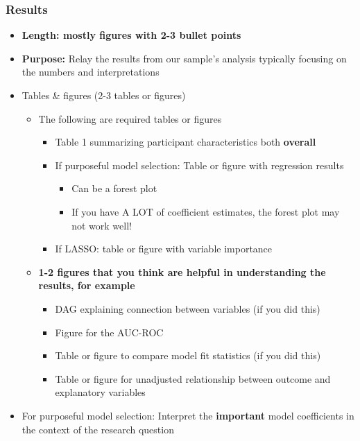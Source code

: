 \documentclass[
  letterpaper,
  DIV=11,
  numbers=noendperiod]{scrartcl}
\providecommand{\tightlist}{%
  \setlength{\itemsep}{0pt}\setlength{\parskip}{0pt}}\usepackage{longtable,booktabs,array}
\begin{document}
\subsubsection{Results}\label{results}

\begin{itemize}
\tightlist
\item
  \textbf{Length: mostly figures with 2-3 bullet points}
\item
  \textbf{Purpose:} Relay the results from our sample's analysis
  typically focusing on the numbers and interpretations
\item
  Tables \& figures (2-3 tables or figures)

  \begin{itemize}
  \tightlist
  \item
    The following are required tables or figures

    \begin{itemize}
    \tightlist
    \item
      Table 1 summarizing participant characteristics both
      \textbf{overall}
    \item
      If purposeful model selection: Table or figure with regression
      results

      \begin{itemize}
      \tightlist
      \item
        Can be a forest plot
      \item
        If you have A LOT of coefficient estimates, the forest plot may
        not work well!
      \end{itemize}
    \item
      If LASSO: table or figure with variable importance
    \end{itemize}
  \item
    \textbf{1-2 figures that you think are helpful in understanding the
    results, for example}

    \begin{itemize}
    \tightlist
    \item
      DAG explaining connection between variables (if you did this)
    \item
      Figure for the AUC-ROC
    \item
      Table or figure to compare model fit statistics (if you did this)
    \item
      Table or figure for unadjusted relationship between outcome and
      explanatory variables
    \end{itemize}
  \end{itemize}
\item
  {For purposeful model selection:} Interpret the \textbf{important}
  model coefficients in the context of the research question


\end{itemize}
\end{document}
